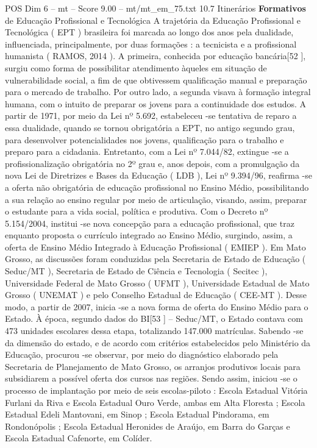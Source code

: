 \begin{textsample}{POS Dim 6 – mt – Score 9.00 – mt/mt\_em\_75.txt}  \label{ex:f6_pos_163}
10.7 Itinerários \textbf{Formativos} de Educação Profissional e Tecnológica A trajetória da Educação Profissional e Tecnológica ( EPT ) brasileira foi marcada ao longo dos anos pela dualidade, influenciada, principalmente, por duas formações : a tecnicista e a profissional humanista ( RAMOS, 2014 ).
A primeira, conhecida por educação bancária[52 ], surgiu como forma de possibilitar atendimento àqueles em situação de vulnerabilidade social, a fim de que obtivessem qualificação manual e preparação para o mercado de trabalho.
Por outro lado, a segunda visava à formação integral humana, com o intuito de preparar os jovens para a continuidade dos estudos.
A partir de 1971, por meio da Lei nº 5.692, estabeleceu -se tentativa de reparo a essa dualidade, quando se tornou obrigatória a EPT, no antigo segundo grau, para desenvolver potencialidades nos jovens, qualificação para o trabalho e preparo para a cidadania.
Entretanto, com a Lei nº 7.044/82, extingue -se a profissionalização obrigatória no 2º grau e, anos depois, com a promulgação da nova Lei de Diretrizes e Bases da Educação ( LDB ), Lei nº 9.394/96, reafirma -se a oferta não obrigatória de educação profissional no Ensino Médio, possibilitando a sua relação ao ensino regular por meio de articulação, visando, assim, preparar o estudante para a vida social, política e produtiva.
Com o Decreto nº 5.154/2004, institui -se nova concepção para a educação profissional, que traz enquanto proposta o currículo integrado ao Ensino Médio, surgindo, assim, a oferta de Ensino Médio Integrado à Educação Profissional ( EMIEP ).
Em Mato Grosso, as discussões foram conduzidas pela Secretaria de Estado de Educação ( Seduc/MT ), Secretaria de Estado de Ciência e Tecnologia ( Secitec ), Universidade Federal de Mato Grosso ( UFMT ), Universidade Estadual de Mato Grosso ( UNEMAT ) e pelo Conselho Estadual de Educação ( CEE-MT ).
Desse modo, a partir de 2007, inicia -se a nova forma de oferta do Ensino Médio para o Estado.
À época, segundo dados do BI[53 ] – Seduc/MT, o Estado contava com 473 unidades escolares dessa etapa, totalizando 147.000 matrículas.
Sabendo -se da dimensão do estado, e de acordo com critérios estabelecidos pelo Ministério da Educação, procurou -se observar, por meio do diagnóstico elaborado pela Secretaria de Planejamento de Mato Grosso, os arranjos produtivos locais para subsidiarem a possível oferta dos cursos nas regiões.
Sendo assim, iniciou -se o processo de implantação por meio de seis escolas-piloto : Escola Estadual Vitória Furlani da Riva e Escola Estadual Ouro Verde, ambas em Alta Floresta ; Escola Estadual Edeli Mantovani, em Sinop ; Escola Estadual Pindorama, em Rondonópolis ; Escola Estadual Heronides de Araújo, em Barra do Garças e Escola Estadual Cafenorte, em Colíder.

\end{textsample}
